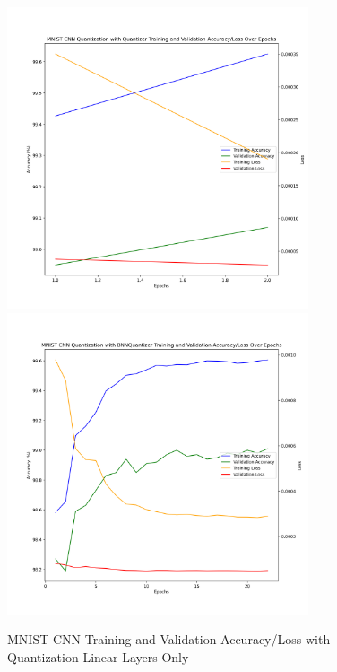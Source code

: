 \documentclass{article}
\begin{document}
\begin{figure}
    \centerline{\includegraphics[width=3.5in]{../proj2/figures/mnist_cnn_QAT_Quantizer_linear.png}\includegraphics[width=3.5in]{../proj2/figures/mnist_cnn_BNNQuantizer_linear.png}}
    \caption{MNIST CNN Training and Validation Accuracy/Loss with Quantization Linear Layers Only}
    \label{fig:mnist-charts-old}
\end{figure}
\end{document}
